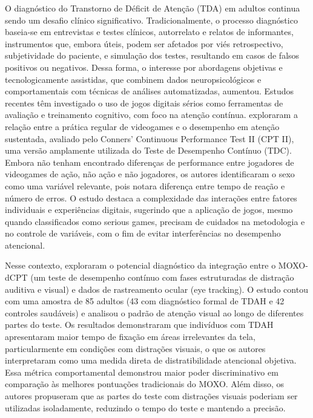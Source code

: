 O diagnóstico do Transtorno de Déficit de Atenção (TDA) em adultos continua sendo
um desafio clínico significativo. Tradicionalmente, o processo diagnóstico baseia-se em
entrevistas e testes clínicos, autorrelato e relatos de informantes, instrumentos que, embora
úteis, podem ser afetados por viés retrospectivo, subjetividade do paciente, e simulação dos
testes, resultando em casos de falsos positivos ou negativos. Dessa forma, o interesse por
abordagens objetivas e tecnologicamente assistidas, que combinem dados neuropsicológicos
e comportamentais com técnicas de análises automatizadas, aumentou. Estudos recentes
têm investigado o uso de jogos digitais sérios como ferramentas de avaliação e treinamento
cognitivo, com foco na atenção contínua. \textcite{Nascimento2020} exploraram a relação
entre a prática regular de videogames e o desempenho em atenção sustentada, avaliado
pelo Conners’ Continuous Performance Test II (CPT II), uma versão amplamente utilizada do
Teste de Desempenho Contínuo (TDC). Embora não tenham encontrado diferenças de
performance entre jogadores de videogames de ação, não ação e não jogadores, os autores
identificaram o sexo como uma variável relevante, pois notara diferença entre tempo de
reação e número de erros. O estudo destaca a complexidade das interações entre fatores
individuais e experiências digitais, sugerindo que a aplicação de jogos, mesmo quando
classificados como serious games, precisam de cuidados na metodologia e no controle de
variáveis, com o fim de evitar interferências no desempenho atencional.

Nesse contexto, \textcite{Elbaum2020} exploraram o potencial diagnóstico da integração
entre o MOXO-dCPT (um teste de desempenho contínuo com fases estruturadas de distração
auditiva e visual) e dados de rastreamento ocular (eye tracking). O estudo contou com uma
amostra de 85 adultos (43 com diagnóstico formal de TDAH e 42 controles saudáveis) e
analisou o padrão de atenção visual ao longo de diferentes partes do teste. Os resultados
demonstraram que indivíduos com TDAH apresentaram maior tempo de fixação em áreas
irrelevantes da tela, particularmente em condições com distrações visuais, o que os autores
interpretaram como uma medida direta de distratibilidade atencional objetiva. Essa métrica
comportamental demonstrou maior poder discriminativo em comparação às melhores
pontuações tradicionais do MOXO. Além disso, os autores propuseram que as partes do teste
com distrações visuais poderiam ser utilizadas isoladamente, reduzindo o tempo do teste e
mantendo a precisão.

